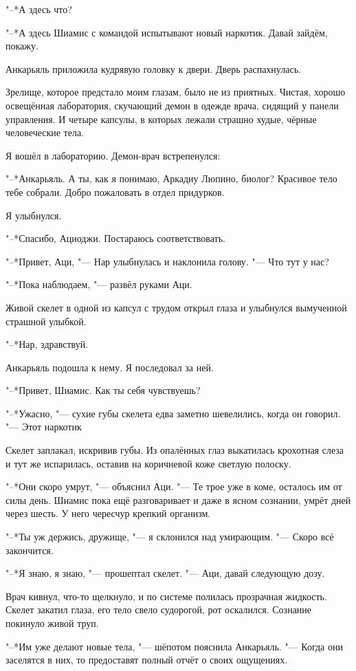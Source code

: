 \documentclass[a4paper,10pt]{book}
\newcommand{\ldotst}{\so{...}\xspace}
\begin{document}
"--*А здесь что?

"--*А здесь Шиамис с командой испытывают новый наркотик. Давай зайдём, покажу.

Анкарьяль приложила кудрявую головку к двери. Дверь распахнулась.

Зрелище, которое предстало моим глазам, было не из приятных. Чистая, хорошо 
освещённая лаборатория, скучающий демон в одежде врача, сидящий у панели 
управления. И четыре капсулы, в которых лежали страшно худые, чёрные 
человеческие тела.

Я вошёл в лабораторию. Демон-врач встрепенулся:

"--*Анкарьяль. А ты, как я понимаю, Аркадиу Люпино, биолог? Красивое тело 
тебе собрали. Добро пожаловать в отдел придурков.

Я улыбнулся.

"--*Спасибо, Ациоджи. Постараюсь соответствовать.

"--*Привет, Аци, "--- Нар улыбнулась и наклонила голову. "--- Что тут у нас?

"--*Пока наблюдаем, "--- развёл руками Аци.

Живой скелет в одной из капсул с трудом открыл глаза и улыбнулся вымученной 
страшной улыбкой.

"--*Нар, здравствуй.

Анкарьяль подошла к нему. Я последовал за ней.

"--*Привет, Шиамис. Как ты себя чувствуешь?

"--*Ужасно, "--- сухие губы скелета едва заметно шевелились, когда он говорил. 
"--- Этот наркотик\ldotst

Скелет заплакал, искривив губы. Из опалённых глаз выкатилась крохотная слеза и 
тут же испарилась, оставив на коричневой коже светлую полоску.

"--*Они скоро умрут, "--- объяснил Аци. "--- Те трое уже в коме, осталось им от 
силы день. Шиамис пока ещё разговаривает и даже в ясном сознании, умрёт дней 
через шесть. У него чересчур крепкий организм.

"--*Ты уж держись, дружище, "--- я склонился над умирающим. "--- Скоро всё 
закончится.

"--*Я знаю, я знаю, "--- прошептал скелет. "--- Аци, давай следующую дозу.

Врач кивнул, что-то щелкнуло, и по системе полилась прозрачная жидкость. Скелет 
закатил глаза, его тело свело судорогой, рот оскалился. Сознание покинуло живой 
труп.

"--*Им уже делают новые тела, "--- шёпотом пояснила Анкарьяль. "--- Когда они 
заселятся в них, то предоставят полный отчёт о своих ощущениях.
\end{document}
